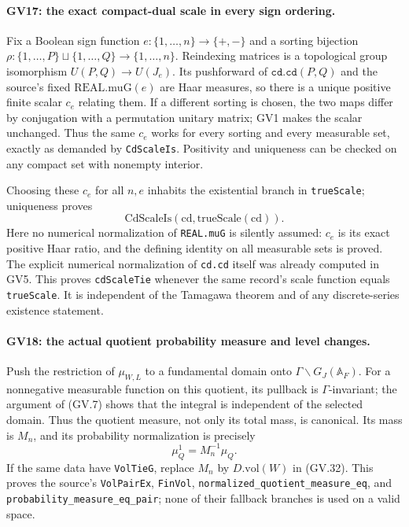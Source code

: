 \paragraph{GV17: the exact compact-dual scale in every sign ordering.}
Fix a Boolean sign function $e:\{1,\ldots,n\}\to\{+,-\}$ and
a sorting bijection $\rho:\{1,\ldots,P\}\sqcup\{1,\ldots,Q\}
\to\{1,\ldots,n\}$. Reindexing matrices is a topological group
isomorphism $U(P,Q)\to U(J_e)$. Its pushforward of
$\texttt{cd.cd}(P,Q)$ and the source's fixed
$\mathrm{REAL.muG}(e)$ are Haar measures, so there is a unique
positive finite scalar $c_e$ relating them. If a different sorting
is chosen, the two maps differ by conjugation with a permutation
unitary matrix; GV1 makes the scalar unchanged. Thus the same $c_e$
works for every sorting and every measurable set, exactly as demanded
by \texttt{CdScaleIs}. Positivity and uniqueness can be checked on
any compact set with nonempty interior.

Choosing these $c_e$ for all $n,e$ inhabits the existential branch
in \texttt{trueScale}; uniqueness proves
\[
               \mathrm{CdScaleIs}(\mathrm{cd},
                                  \mathrm{trueScale}(\mathrm{cd})).
 \tag{GV.31}
\]
Here no numerical normalization of \texttt{REAL.muG} is silently
assumed: $c_e$ is its exact positive Haar ratio, and the defining
identity on all measurable sets is proved. The explicit numerical
normalization of \texttt{cd.cd} itself was already computed in GV5.
This proves \texttt{cdScaleTie} whenever the same record's scale
function equals \texttt{trueScale}. It is independent of the
Tamagawa theorem and of any discrete-series existence statement.

\paragraph{GV18: the actual quotient probability measure and level changes.}
Push the restriction of $\mu_{W,L}$ to a fundamental domain onto
$\Gamma\backslash G_J(\mathbb A_F)$. For a nonnegative measurable
function on this quotient, its pullback is $\Gamma$-invariant;
the argument of (GV.7) shows that the integral is independent of
the selected domain. Thus the quotient measure, not only its total
mass, is canonical. Its mass is $M_n$, and its probability
normalization is precisely
\[
                       \mu_Q^1=M_n^{-1}\mu_Q.
 \tag{GV.32}
\]
If the same data have \texttt{VolTieG}, replace $M_n$ by
$D.\mathrm{vol}(W)$ in (GV.32). This proves the source's
\texttt{VolPairEx}, \texttt{FinVol},
\texttt{normalized\_quotient\_measure\_eq}, and
\texttt{probability\_measure\_eq\_pair}; none of their fallback
branches is used on a valid space.

